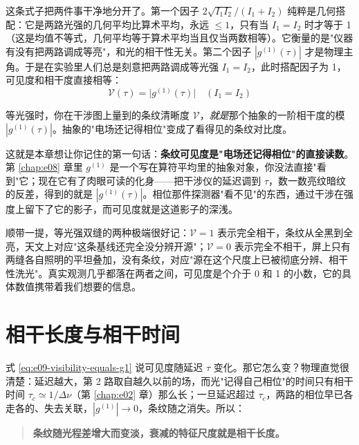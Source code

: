 这条式子把两件事干净地分开了。第一个因子 \(2\sqrt{I_1 I_2}/(I_1+I_2)\) 纯粹是几何搭配：它是两路光强的几何平均比算术平均，永远 \(\le 1\)，只有当 \(I_1=I_2\) 时才等于 1（这是均值不等式，几何平均等于算术平均当且仅当两数相等）。它衡量的是"仪器有没有把两路调成等亮"，和光的相干性无关。第二个因子 \(|g^{(1)}(\tau)|\) 才是物理主角。于是在实验里人们总是刻意把两路调成等光强 \(I_1=I_2\)，此时搭配因子为 1，可见度和相干度直接相等：
\begin{equation}
  \boxed{\;\mathcal V(\tau)=\big|g^{(1)}(\tau)\big|\quad(I_1=I_2)\;}
  \label{eq:e09-visibility-equals-g1}
\end{equation}
\begin{formulaexplain}
等光强时，你在干涉图上量到的条纹清晰度 \(\mathcal V\)，\emph{就是}那个抽象的一阶相干度的模 \(|g^{(1)}(\tau)|\)。抽象的"电场还记得相位"变成了看得见的条纹对比度。
\end{formulaexplain}

这就是本章想让你记住的第一句话：\textbf{条纹可见度是"电场还记得相位"的直接读数}。第 \ref{chap:e08} 章里 \(g^{(1)}\) 是一个写在算符平均里的抽象对象，你没法直接"看到"它；现在它有了肉眼可读的化身——把干涉仪的延迟调到 \(\tau\)，数一数亮纹暗纹的反差，得到的就是 \(|g^{(1)}(\tau)|\)。相位那件探测器"看不见"的东西，通过干涉在强度上留下了它的影子，而可见度就是这道影子的深浅。

顺带一提，等光强双缝的两种极端很好记：\(\mathcal V=1\) 表示完全相干，条纹从全黑到全亮，天文上对应"这条基线还完全没分辨开源"；\(\mathcal V=0\) 表示完全不相干，屏上只有两缝各自照明的平坦叠加，没有条纹，对应"源在这个尺度上已被彻底分辨、相干性洗光"。真实观测几乎都落在两者之间，可见度是个介于 0 和 1 的小数，它的具体数值携带着我们想要的信息。

\section{相干长度与相干时间}
\label{sec:e09-coherence-length}

式 \eqref{eq:e09-visibility-equals-g1} 说可见度随延迟 \(\tau\) 变化。那它怎么变？物理直觉很清楚：延迟越大，第 2 路取自越久以前的场，而光"记得自己相位"的时间只有相干时间 \(\tau_c\simeq1/\Delta\nu\)（第 \ref{chap:e02} 章）那么长；一旦延迟超过 \(\tau_c\)，两路的相位早已各走各的、失去关联，\(|g^{(1)}|\to0\)，条纹随之消失。所以：

\begin{quote}
\textbf{条纹随光程差增大而变淡，衰减的特征尺度就是相干长度。}
\end{quote}

